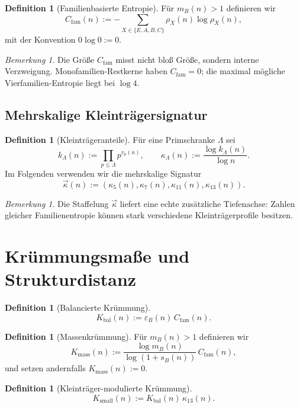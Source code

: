 \documentclass[11pt,a4paper]{article}
\theoremstyle{definition}
\newtheorem{definition}[satz]{Definition}
\theoremstyle{remark}
\newtheorem{bemerkung}[satz]{Bemerkung}
\begin{document}
\begin{definition}[Familienbasierte Entropie]
Für $m_B(n)>1$ definieren wir
\[
 C_{\mathrm{fam}}(n):=-\sum_{X\in\{E,A,B,C\}} \rho_X(n)\log \rho_X(n),
\]
mit der Konvention $0\log 0:=0$.
\end{definition}

\begin{bemerkung}
Die Größe $C_{\mathrm{fam}}$ misst nicht bloß Größe, sondern interne Verzweigung. Monofamilien-Restkerne haben $C_{\mathrm{fam}}=0$; die maximal mögliche Vierfamilien-Entropie liegt bei $\log 4$.
\end{bemerkung}

\subsection{Mehrskalige Kleinträgersignatur}

\begin{definition}[Kleinträgeranteile]
Für eine Primschranke $\Lambda$ sei
\[
 k_\Lambda(n):=\prod_{p\le \Lambda} p^{v_p(n)},
 \qquad
 \kappa_\Lambda(n):=\frac{\log k_\Lambda(n)}{\log n}.
\]
Im Folgenden verwenden wir die mehrskalige Signatur
\[
 \vec\kappa(n):=(\kappa_5(n),\kappa_7(n),\kappa_{11}(n),\kappa_{13}(n)).
\]
\end{definition}

\begin{bemerkung}
Die Staffelung $\vec\kappa$ liefert eine echte zusätzliche Tiefenachse: Zahlen gleicher Familienentropie können stark verschiedene Kleinträgerprofile besitzen.
\end{bemerkung}

\section{Krümmungsmaße und Strukturdistanz}

\begin{definition}[Balancierte Krümmung]
\[
 K_{\mathrm{bal}}(n):=\varepsilon_B(n)\,C_{\mathrm{fam}}(n).
\]
\end{definition}

\begin{definition}[Massenkrümmung]
Für $m_B(n)>1$ definieren wir
\[
 K_{\mathrm{mass}}(n):=\frac{\log m_B(n)}{\log(1+s_B(n))}\,C_{\mathrm{fam}}(n),
\]
und setzen andernfalls $K_{\mathrm{mass}}(n):=0$.
\end{definition}

\begin{definition}[Kleinträger-modulierte Krümmung]
\[
 K_{\mathrm{small}}(n):=K_{\mathrm{bal}}(n)\,\kappa_{13}(n).
\]
\end{definition}
\end{document}
